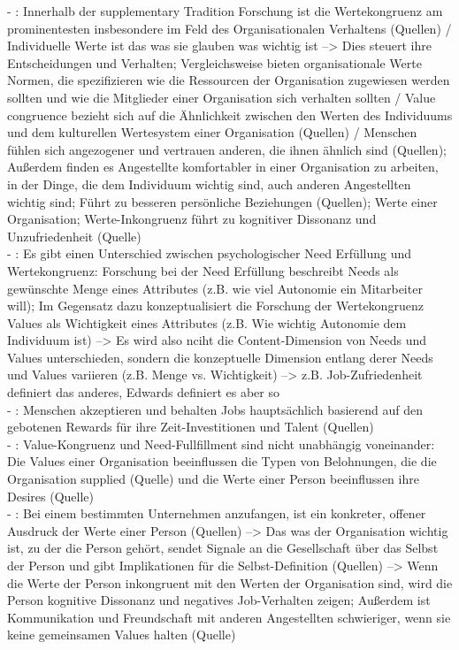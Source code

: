 - \cite[S. 2]{edwards:2004}: Innerhalb der supplementary Tradition Forschung ist die Wertekongruenz am prominentesten insbesondere im Feld des Organisationalen Verhaltens (Quellen) / Individuelle Werte ist das was sie glauben was wichtig ist --> Dies steuert ihre Entscheidungen und Verhalten; Vergleichsweise bieten organisationale Werte Normen, die spezifizieren wie die Ressourcen der Organisation zugewiesen werden sollten und wie die Mitglieder einer Organisation sich verhalten sollten / Value congruence bezieht sich auf die Ähnlichkeit zwischen den Werten des Individuums und dem kulturellen Wertesystem einer Organisation (Quellen) / Menschen fühlen sich angezogener und vertrauen anderen, die ihnen ähnlich sind (Quellen); Außerdem finden es Angestellte komfortabler in einer Organisation zu arbeiten, in der Dinge, die dem Individuum wichtig sind, auch anderen Angestellten wichtig sind; Führt zu besseren persönliche Beziehungen (Quellen); Werte einer Organisation; Werte-Inkongruenz führt zu kognitiver Dissonanz und Unzufriedenheit (Quelle) \\
- \cite[S. 2]{edwards:2004}: Es gibt einen Unterschied zwischen psychologischer Need Erfüllung und Wertekongruenz: Forschung bei der Need Erfüllung beschreibt Needs als gewünschte Menge eines Attributes (z.B. wie viel Autonomie ein Mitarbeiter will); Im Gegensatz dazu konzeptualisiert die Forschung der Wertekongruenz Values als Wichtigkeit eines Attributes (z.B. Wie wichtig Autonomie dem Individuum ist) --> Es wird also nciht die Content-Dimension von Needs und Values unterschieden, sondern die konzeptuelle Dimension entlang derer Needs und Values variieren (z.B. Menge vs. Wichtigkeit) --> z.B. Job-Zufriedenheit definiert das anderes, Edwards definiert es aber so \\
- \cite[S. 3]{edwards:2004}: Menschen akzeptieren und behalten Jobs hauptsächlich basierend auf den gebotenen Rewards für ihre Zeit-Investitionen und Talent (Quellen) \\
- \cite[S. 3]{edwards:2004}: Value-Kongruenz und Need-Fullfillment sind nicht unabhängig voneinander: Die Values einer Organisation beeinflussen die Typen von Belohnungen, die die Organisation supplied (Quelle) und die Werte einer Person beeinflussen ihre Desires (Quelle) \\
- \cite[S. 3]{edwards:2004}: Bei einem bestimmten Unternehmen anzufangen, ist ein konkreter, offener Ausdruck der Werte einer Person (Quellen) --> Das was der Organisation wichtig ist, zu der die Person gehört, sendet Signale an die Gesellschaft über das Selbst der Person und gibt Implikationen für die Selbst-Definition (Quellen) --> Wenn die Werte der Person inkongruent mit den Werten der Organisation sind, wird die Person kognitive Dissonanz und negatives Job-Verhalten zeigen; Außerdem ist Kommunikation und Freundschaft mit anderen Angestellten schwieriger, wenn sie keine gemeinsamen Values halten (Quelle)\\
